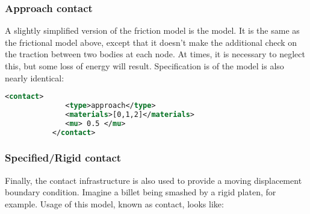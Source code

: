 \subsubsection{Approach contact}
A slightly simplified version of the friction model is the
 model.  It is the same as the frictional model
above, except that it doesn't make the additional check on the traction
between two bodies at each node.  At times, it is necessary to neglect this,
but some loss of energy will result.  Specification is of the model is 
also nearly identical:

\begin{lstlisting}[language=XML]
           <contact>
              <type>approach</type>
              <materials>[0,1,2]</materials>
              <mu> 0.5 </mu>
           </contact>
\end{lstlisting}

\subsubsection{Specified/Rigid contact}
Finally, the contact infrastructure is also used to provide a moving
displacement boundary condition.  Imagine a billet being smashed by a
rigid platen, for example.  Usage of this model, known as
 contact, looks like:

